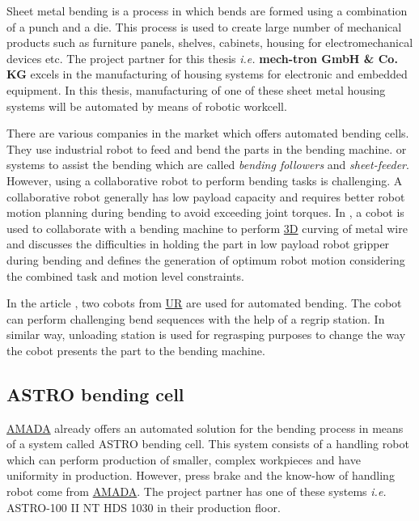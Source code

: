 Sheet metal bending is a process in which bends are formed using a combination of a punch and a die. This process is used to create large number of mechanical products such as furniture panels, shelves, cabinets, housing for electromechanical devices etc. \cite{alvaautomated}
The project partner for this thesis \textit{i.e.} \textbf{mech-tron GmbH \& Co. KG} excels in the manufacturing of housing systems for electronic and embedded equipment. In this thesis, manufacturing of one of these sheet metal housing systems will be automated by means of robotic workcell.


There are various companies in the market which offers automated bending cells. They use industrial robot to feed and bend the parts in the bending machine. \cite{mekoprint, shenchong, shopmetal} or systems to assist the bending which are called \textit{bending followers} and \textit{sheet-feeder}. \cite{guimaraes2009bending} However, using a collaborative robot to perform bending tasks is challenging. A collaborative robot generally has low payload capacity and requires better robot motion planning during bending to avoid exceeding joint torques.
In \cite{liu2022metalwiremanipulationplanning}, a cobot is used to collaborate with a bending machine to perform \hyperref[acro:3D]{3D} curving of metal wire and discusses the difficulties in holding the
part in low payload robot gripper during bending and defines the generation of optimum robot motion considering the combined task and motion level constraints.

In the article \cite{cobotfabricator}, two cobots from \hyperref[acro:UR]{UR} are used for automated bending. The cobot can perform challenging bend sequences with the help of a regrip station. In similar way, unloading station is used for regrasping purposes to change the way the cobot presents the part to the bending machine.

\subsection{ASTRO bending cell}
\label{subsec:astro}

\hyperref[acro:AMADA]{AMADA} already offers an automated solution for the bending process in means of a system called ASTRO bending cell. This system consists of a handling robot which can perform production of smaller, complex workpieces and have uniformity in production. However, press brake and the know-how of handling robot come from \hyperref[acro:AMADA]{AMADA}.
The project partner has one of these systems \textit{i.e.} ASTRO-100 II NT HDS 1030 in their production floor. 

